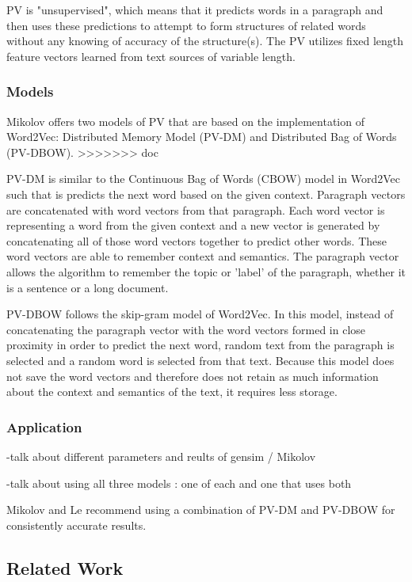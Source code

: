 PV is "unsupervised", which means that it predicts words in a paragraph and then uses these predictions to attempt to form structures of related words without any knowing of accuracy of the structure(s). The PV utilizes fixed length feature vectors learned from text sources of variable length. 


\subsubsection{Models}
Mikolov offers two models of PV that are based on the implementation of Word2Vec: Distributed Memory Model (PV-DM) and Distributed Bag of Words (PV-DBOW). 
>>>>>>> doc

PV-DM is similar to the Continuous Bag of Words (CBOW) model in Word2Vec such that is predicts the next word based on the given context. Paragraph vectors are concatenated with word vectors from that paragraph.  Each word vector is representing a word from the given context and a new vector is generated by concatenating all of those word vectors together to predict other words. These word vectors are able to remember context and semantics. The paragraph vector allows the algorithm to remember the topic or 'label' of the paragraph, whether it is a sentence or a long document. 

PV-DBOW follows the skip-gram model of Word2Vec. In this model, instead of concatenating the paragraph vector with the word vectors formed in close proximity in order to predict the next word, random text from the paragraph is selected and a random word is selected from that text. Because this model does not save the word vectors and therefore does not retain as much information about the context and semantics of the text, it requires less storage.

\subsubsection{Application}
-talk about different parameters and reults of gensim / Mikolov 

-talk about using all three models : one of each and one that uses both

Mikolov and Le recommend using a combination of PV-DM and PV-DBOW for consistently accurate results.  \cite{RefWorks:doc:5a6e5746e4b0d609eec798d7}

\subsection{Related Work}
\label{sec:related-work}

